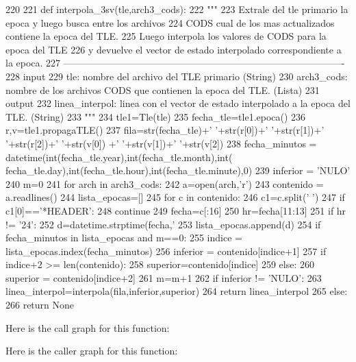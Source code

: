 \begin{DoxyCode}
220 
221 def interpola_3sv(tle,arch3_cods):
222     """
223     Extrale del tle primario la epoca y luego busca entre los archivos
224     CODS cual de los mas actualizados contiene la epoca del TLE.
225     Luego interpola los valores de CODS para la epoca del TLE 
226     y devuelve el vector de estado interpolado correspondiente a la epoca.
227    
       ----------------------------------------------------------------------------------------
228     input
229         tle: nombre del archivo del TLE primario (String)
230         arch3_cods: nombre de los archivos CODS que contienen la epoca del TLE.
       (Lista)
231     output
232         linea_interpol: linea con el vector de estado interpolado a la epoca
       del TLE. (String)
233     """
234     tle1=Tle(tle)
235     fecha_tle=tle1.epoca()
236     r,v=tle1.propagaTLE()
237     fila=str(fecha_tle)+' '+str(r[0])+' '+str(r[1])+' '+str(r[2])+' '+str(v[0])
      +' '+str(v[1])+' '+str(v[2])
238     fecha_minutos = datetime(int(fecha_tle.year),int(fecha_tle.month),int(
      fecha_tle.day),int(fecha_tle.hour),int(fecha_tle.minute),0)
239     inferior = 'NULO' 
240     m=0
241     for arch in arch3_cods:
242         a=open(arch,'r')
243         contenido = a.readlines()
244         lista_epocas=[]
245         for c in contenido:
246             c1=c.split(' ')
247             if c1[0]=='*HEADER':
248                 continue
249             fecha=c[:16]
250             hr=fecha[11:13]
251             if hr != '24':
252                 d=datetime.strptime(fecha,'%
253             lista_epocas.append(d)
254         if fecha_minutos in lista_epocas and m==0:
255             indice = lista_epocas.index(fecha_minutos)
256             inferior = contenido[indice+1]
257             if indice+2 >= len(contenido):
258                 superior=contenido[indice]
259             else: 
260                 superior = contenido[indice+2]
261             m=m+1   
262     if inferior != 'NULO':         
263         linea_interpol=interpola(fila,inferior,superior)    
264         return linea_interpol
265     else:
266         return None

\end{DoxyCode}


\-Here is the call graph for this function\-:




\-Here is the caller graph for this function\-:


